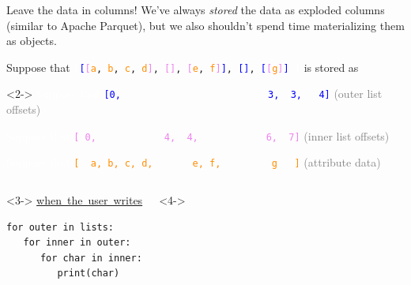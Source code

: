 \documentclass[aspectratio=169]{beamer}
\begin{document}
\begin{frame}[fragile]{Leave the data in columns!}
\vspace{0.5 cm}
We've always {\it stored} the data as exploded columns (similar to Apache Parquet), but we also shouldn't spend time materializing them as objects.

\vspace{0.25 cm}
Suppose that {\tt\small \textcolor{white}{[}\textcolor{blue}{[}\textcolor{violet}{[}\textcolor{darkorange}{a}, \textcolor{darkorange}{b}, \textcolor{darkorange}{c}, \textcolor{darkorange}{d}\textcolor{violet}{]}, \textcolor{violet}{[]}, \textcolor{violet}{[}\textcolor{darkorange}{e}, \textcolor{darkorange}{f}\textcolor{violet}{]}\textcolor{blue}{]}, \textcolor{blue}{[]}, \textcolor{blue}{[}\textcolor{violet}{[}\textcolor{darkorange}{g}\textcolor{violet}{]}\textcolor{blue}{]}\ \textcolor{white}{]}} is stored as

\begin{uncoverenv}<2->
\textcolor{white}{Suppose that}
             {\tt\small \textcolor{blue}{[0,\ \ \ \ \ \ \ \ \ \ \ \ \ \ \ \ \ \ \ \ \ \ \ \ \ \ 3,\ \ 3,\ \ \ 4]}} \textcolor{gray}{(outer list offsets)}

\textcolor{white}{Suppose that}
             {\tt\small \textcolor{violet}{[\ 0,\ \ \ \ \ \ \ \ \ \ \ \ 4,\ \ 4,\ \ \ \ \ \ \ \ \ \ \ \ 6,\ \ 7]}} \textcolor{gray}{(inner list offsets)}

\textcolor{white}{Suppose that}
             {\tt\small \textcolor{darkorange}{[\ \ a,\ b,\ c,\ d,\ \ \ \ \ \ \ e,\ f,\ \ \ \ \ \ \ \ \ g\ \ \ ]}} \textcolor{gray}{(attribute data)}
\end{uncoverenv}

\vspace{0.5 cm}
\begin{columns}[t]
\begin{uncoverenv}<3->
\mbox{\hspace{-0.1 cm}\underline{when the user writes}}

\vspace{-0.25 cm}
\small
\begin{verbatim}
for outer in lists:
   for inner in outer:
      for char in inner:
         print(char)
\end{verbatim}
\end{uncoverenv}

\begin{uncoverenv}<4->
\mbox{\hspace{-0.1 cm}}


\end{uncoverenv}
\end{columns}
\end{frame}
\end{document}
